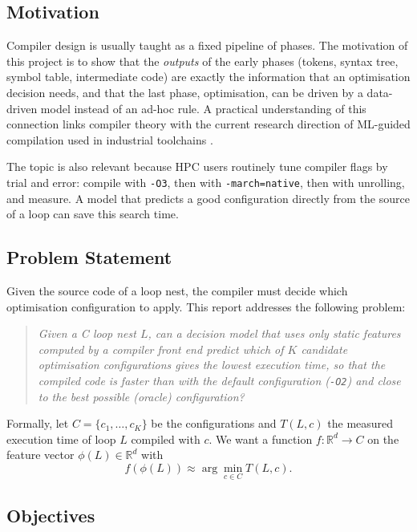 \subsection{Motivation}

Compiler design is usually taught as a fixed pipeline of phases. The motivation
of this project is to show that the \emph{outputs} of the early phases (tokens,
syntax tree, symbol table, intermediate code) are exactly the information that
an optimisation decision needs, and that the last phase, optimisation, can be
driven by a data-driven model instead of an ad-hoc rule. A practical
understanding of this connection links compiler theory with the current
research direction of ML-guided compilation used in industrial toolchains
\cite{trofin2021,chen2018}.

The topic is also relevant because HPC users routinely tune compiler flags by
trial and error: compile with \texttt{-O3}, then with \texttt{-march=native},
then with unrolling, and measure. A model that predicts a good configuration
directly from the source of a loop can save this search time.

\subsection{Problem Statement}

Given the source code of a loop nest, the compiler must decide which
optimisation configuration to apply. This report addresses the following
problem:

\begin{quote}
\textit{Given a C loop nest $L$, can a decision model that uses only static
features computed by a compiler front end predict which of $K$ candidate
optimisation configurations gives the lowest execution time, so that the
compiled code is faster than with the default configuration (\texttt{-O2})
and close to the best possible (oracle) configuration?}
\end{quote}

Formally, let $C=\{c_1,\dots,c_K\}$ be the configurations and $T(L,c)$ the
measured execution time of loop $L$ compiled with $c$. We want a function
$f:\mathbb{R}^{d}\rightarrow C$ on the feature vector $\phi(L)\in\mathbb{R}^{d}$ with
\begin{equation}
f(\phi(L)) \approx \arg\min_{c\in C} T(L,c).
\end{equation}

\subsection{Objectives}

